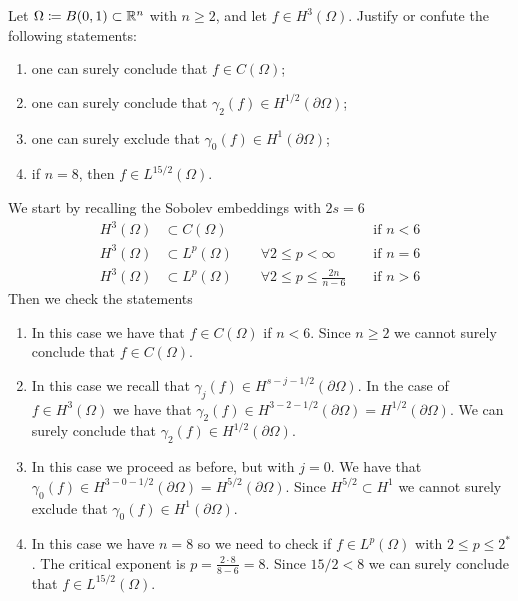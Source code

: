 \newpage
\begin{exercise}
    Let \(\Omega \coloneqq B(0, 1) \subset \mathbb{R}^n\) with \(n \geq 2\), and let \(f \in H^3(\Omega)\). Justify or confute the following statements:
    \begin{enumerate}
        \item one can surely conclude that \(f \in C(\Omega)\);
        \item one can surely conclude that \(\gamma_2(f) \in H^{1/2}(\partial\Omega)\);
        \item one can surely exclude that \(\gamma_0(f) \in H^{1}(\partial\Omega)\);
        \item if \(n = 8\), then \(f \in L^{15/2}(\Omega)\).
    \end{enumerate}
\end{exercise}
We start by recalling the Sobolev embeddings with \(2s = 6\)
\begin{align*}
    H^3(\Omega) & \subset C(\Omega)                                                 &  & \text{ if } n < 6 \\
    H^3(\Omega) & \subset L^p(\Omega) \qquad \forall 2 \leq p < \infty              &  & \text{ if } n = 6 \\
    H^3(\Omega) & \subset L^p(\Omega) \qquad \forall 2 \leq p \leq \frac{2n}{n - 6} &  & \text{ if } n > 6
\end{align*}
Then we check the statements
\begin{enumerate}
    \item In this case we have that \(f \in C(\Omega)\) if \(n < 6\). Since \(n \geq 2\)
          we cannot surely conclude that \(f \in C(\Omega)\).
    \item In this case we recall that \(\gamma_j(f) \in H^{s - j -
                  1/2}(\partial\Omega)\). In the case of \(f \in H^3(\Omega)\) we have that
          \(\gamma_2(f) \in H^{3 - 2 - 1/2}(\partial\Omega) = H^{1/2}(\partial\Omega)\).
          We can surely conclude that \(\gamma_2(f) \in H^{1/2}(\partial\Omega)\).
    \item In this case we proceed as before, but with \(j = 0\). We have that
          \(\gamma_0(f) \in H^{3 - 0 - 1/2}(\partial\Omega) = H^{5/2}(\partial\Omega)\).
          Since \(H^{5/2} \subset H^1\) we cannot surely exclude that \(\gamma_0(f) \in
          H^{1}(\partial\Omega)\).
    \item In this case we have \(n = 8\) so we need to check if \(f \in L^p(\Omega)\)
          with \(2\leq p \leq 2^*\). The critical exponent is \(p = \frac{2\cdot 8}{8 -
              6} = 8\). Since \(15/2 < 8\) we can surely conclude that \(f \in
          L^{15/2}(\Omega)\).
\end{enumerate}

